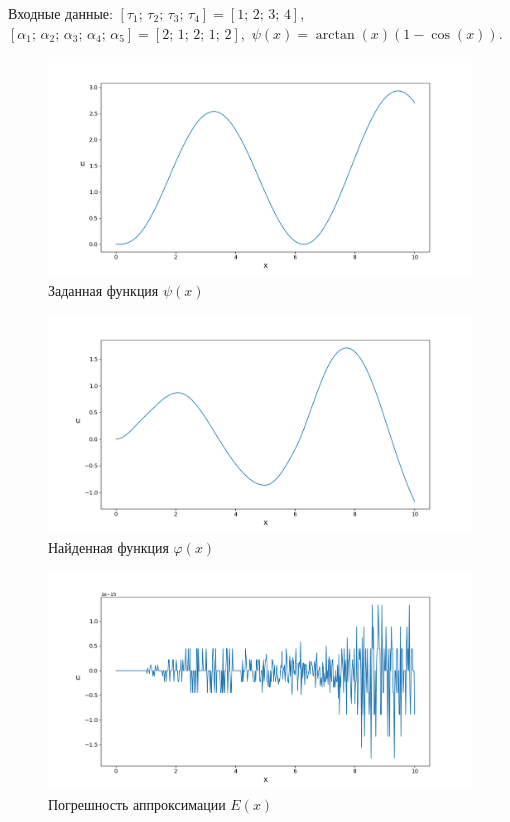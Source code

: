 \documentclass{article}
\theoremstyle{definition}
\begin{document}
Входные данные: 
$[\tau_1;\, \tau_2;\, \tau_3;\, \tau_4] = [1;\, 2;\, 3;\, 4]$, \\[1mm]
$[\alpha_1;\, \alpha_2;\, \alpha_3;\, \alpha_4;\, \alpha_5] = [2;\, 1;\, 2;\, 1;\, 2]$, 
$\,\psi(x) = \arctan(x)(1 - \cos(x))$.
\begin{figure}[H]
	\centering
	\includegraphics[trim={2.475cm, 0, 0, 1.5cm}, clip, scale=0.624]{56_psi.png}
	\caption{Заданная функция $\psi(x)$}
	\label{fig:image15}
\end{figure}

\begin{figure}[H]
	\centering
	\includegraphics[trim={2.175cm, 0, 0, 1.5cm}, clip, scale=0.618]{5_u0.png}
	\caption{Найденная функция $\varphi(x)$}
	\label{fig:image16}
\end{figure}

\begin{figure}[H]
	\centering
	\includegraphics[trim={2.175cm, 0, 0, 1.5cm}, clip, scale=0.618]{5_E.png}
	\caption{Погрешность аппроксимации $E(x)$}
	\label{fig:image17}
\end{figure}
\end{document}
